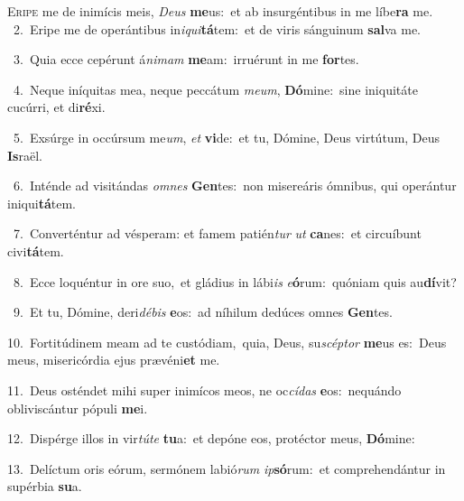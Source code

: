 \lettrine{\initial\textcolor{\initialcolor}{E}}{ripe} me de inimícis meis, \textit{De}\-\textit{us} \textbf{me}\-us:~\star et ab insurgéntibus in me líbe\textbf{ra} me.\\
{\numbfont\textcolor{\numbcolor}{~2.}}~Eripe me de operántibus in\-\textit{i}\-\textit{qui}\textbf{tá}tem:~\star et de viris sánguinum \textbf{sal}\-va me.\par
{\numbfont\textcolor{\numbcolor}{~3.}}~Quia ecce cepérunt á\-\textit{ni}\-\textit{mam} \textbf{me}\-am:~\star irruérunt in me \textbf{for}\-tes.\par
{\numbfont\textcolor{\numbcolor}{~4.}}~Neque iníquitas mea, neque peccátum \textit{me}\-\textit{um}, \textbf{Dó}\-mine:~\star sine iniquitáte cucúrri, et di\-\textbf{ré}\-xi.\par
{\numbfont\textcolor{\numbcolor}{~5.}}~Exsúrge in occúrsum me\-\textit{um}\-, \textit{et} \textbf{vi}\-de:~\star et tu, Dómine, Deus virtútum, Deus \textbf{Is}\-raël.\par
{\numbfont\textcolor{\numbcolor}{~6.}}~Inténde ad visitándas \textit{om}\-\textit{nes} \textbf{Gen}\-tes:~\star non misereáris ómnibus, qui operántur iniqui\-\textbf{tá}\-tem.\par
{\numbfont\textcolor{\numbcolor}{~7.}}~Converténtur ad vésperam: et famem patién\textit{tur} \textit{ut} \textbf{ca}\-nes:~\star et circuíbunt civi\-\textbf{tá}\-tem.\par
{\numbfont\textcolor{\numbcolor}{~8.}}~Ecce loquéntur in ore suo,~\dagger et gládius in lábi\textit{is} \textit{e}\-\textbf{ó}rum:~\star quóniam quis au\-\textbf{dí}\-vit?\par
{\numbfont\textcolor{\numbcolor}{~9.}}~Et tu, Dómine, deri\-\textit{dé}\-\textit{bis} \textbf{e}\-os:~\star ad níhilum dedúces omnes \textbf{Gen}\-tes.\par
{\numbfont\textcolor{\numbcolor}{10.}}~Fortitúdinem meam ad te custódiam,~\dagger quia, Deus, su\-\textit{scép}\-\textit{tor} \textbf{me}\-us es:~\star Deus meus, misericórdia ejus prævéni\textbf{et} me.\par
{\numbfont\textcolor{\numbcolor}{11.}}~Deus osténdet mihi super inimícos meos, ne oc\-\textit{cí}\-\textit{das} \textbf{e}\-os:~\star nequándo obliviscántur pópuli \textbf{me}\-i.\par
{\numbfont\textcolor{\numbcolor}{12.}}~Dispérge illos in vir\-\textit{tú}\-\textit{te} \textbf{tu}\-a:~\star et depóne eos, protéctor meus, \textbf{Dó}\-mine:\par
{\numbfont\textcolor{\numbcolor}{13.}}~Delíctum oris eórum, sermónem labió\textit{rum} \textit{ip}\-\textbf{só}rum:~\star et comprehendántur in supérbia \textbf{su}\-a.\par
